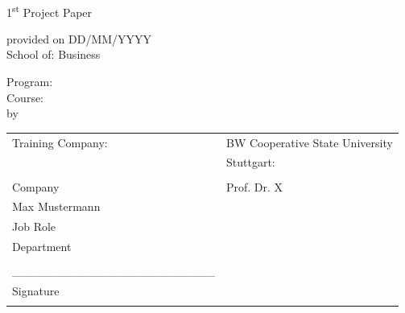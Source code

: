 



\thispagestyle{empty}

\begin{titlepage}
\vspace*{\fill}
\begin{center}
\vspace{3mm}


\textbf{ %
	\papertitle
	} \\
\vspace{1.5cm}


1\textsuperscript{st} Project Paper \\ %
\vspace{1cm}


provided on DD/MM/YYYY \\ %
\vspace{1cm}
School of: Business  \\
\vspace{0.6cm}

Program: \dhbwprogram \\ %
\vspace{0.6cm}
Course: \dhbwcourse \\ %
		
\vspace{2.5cm}
by \\
\paperauthor %
\vspace{3cm}

\begin{tabular}[h]{ll}

Training Company:				&	BW Cooperative State University\\
						&	Stuttgart:\\ 
 						&	\\
Company						&	Prof. Dr. X\\
Max Mustermann					&	\\
Job Role				  	&	\\
Department					&	\\
						&	\\
\_\_\_\_\_\_\_\_\_\_\_\_\_\_\_\_\_\_\_\_\_\_\_\_&	\\				
Signature					&	\\		
						&	\\

\end{tabular}
\end{center}
\vspace*{\fill}
\end{titlepage}

